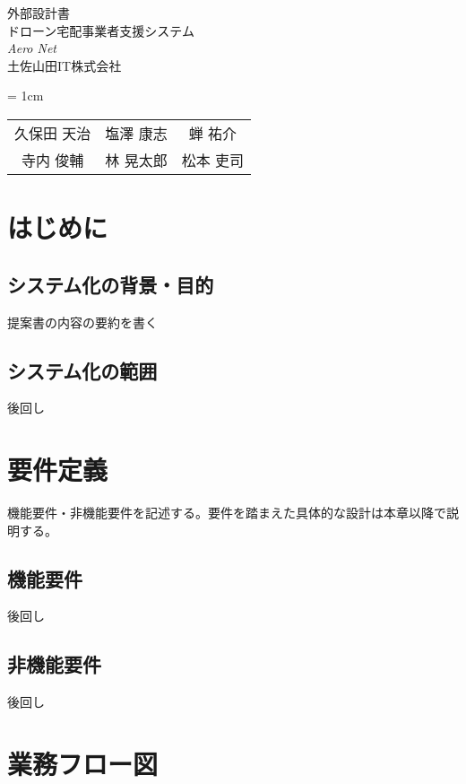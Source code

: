 \documentclass[a4paper, titlepage]{jsarticle}
\date{\today}
\newcommand{\system}{\textsl{Aero Net}}
\begin{document}
\begin{titlepage}
  \centering
  \vspace*{150truept}
  {\Large 外部設計書}\\
  \vspace*{50truept}
  {\Huge ドローン宅配事業者支援システム} \\
  \vspace{15truept}
  {\Huge \system} \\
  \vspace{50truept}
  {\LARGE 土佐山田IT株式会社}\\
  \vspace{20truept}
  {\large{\tabcolsep = 1cm
      \begin{tabular}{ccc}
        久保田 天治 & 塩澤 康志 & 蝉 祐介  \\
        寺内 俊輔  & 林 晃太郎 & 松本 吏司
      \end{tabular}
    }}
\end{titlepage}

\tableofcontents

\clearpage

\section{はじめに}
\subsection{システム化の背景・目的}
提案書の内容の要約を書く
\subsection{システム化の範囲}
後回し
\section{要件定義}
機能要件・非機能要件を記述する。要件を踏まえた具体的な設計は本章以降で説明する。
\subsection{機能要件}
後回し
\subsection{非機能要件}
後回し

\section{業務フロー図}
\end{document}
